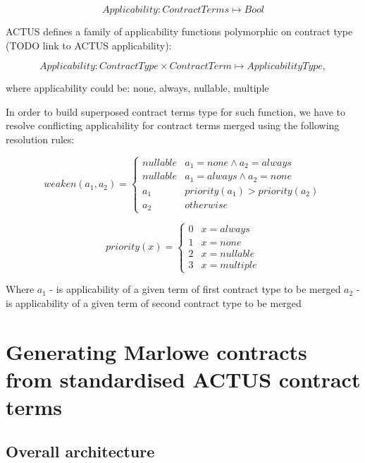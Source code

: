 \documentclass[runningheads]{llncs}
\begin{document}
\noindent 
\begin{equation}
Applicability:ContractTerms\mapsto Bool
\end{equation}

ACTUS defines a family of applicability functions polymorphic on contract
type (TODO link to ACTUS applicability):

\noindent 
\begin{equation}
Applicability:ContractType\times ContractTerm\mapsto ApplicabilityType,
\end{equation}

where applicability could be: none, always, nullable, multiple

In order to build superposed contract terms type for such function,
we have to resolve conflicting applicability for contract terms merged
using the following resolution rules:

\noindent 
\begin{equation}
weaken(a_{1},a_{2})=\begin{cases}
nullable & a_{1}=none\wedge a_{2}=always\\
nullable & a_{1}=always\wedge a_{2}=none\\
a_{1} & priority(a_{1})>priority(a_{2})\\
a_{2} & otherwise
\end{cases}
\end{equation}

\noindent 
\begin{equation}
priority(x)=\begin{cases}
0 & x=always\\
1 & x=none\\
2 & x=nullable\\
3 & x=multiple
\end{cases}
\end{equation}

Where $a_{1}$ - is applicability of a given term of first contract
type to be merged $a_{2}$ - is applicability of a given term of second
contract type to be merged

\section{Generating Marlowe contracts from standardised ACTUS contract terms}

\subsection{Overall architecture }
\end{document}
